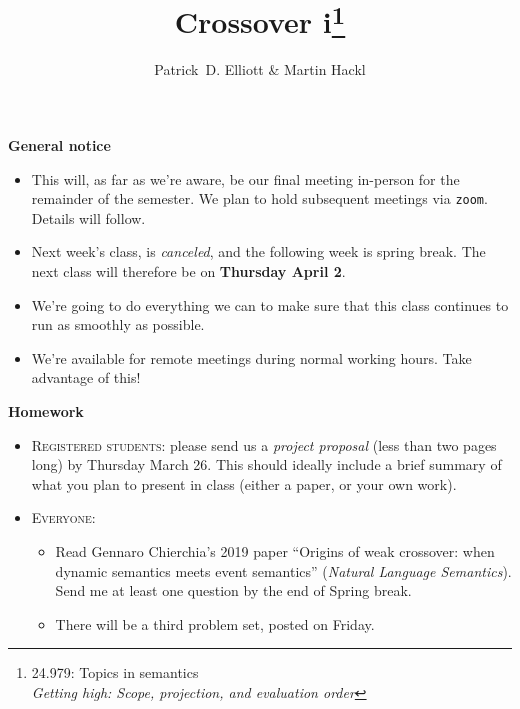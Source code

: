 \documentclass[nols,twoside,nofonts,nobib,nohyper]{tufte-handout}
\title{Crossover i\thanks{24.979: Topics in
    semantics\\\noindent\textit{Getting high: Scope, projection, and evaluation order}}}
\author[Patrick D. Elliott and Martin Hackl]{Patrick~D. Elliott\sidenote{\texttt{pdell@mit.edu}} \& Martin Hackl\sidenote{\texttt{hackl@mit.edu}}}
\begin{document}
\maketitle%

\begin{tcolorbox}
  \textbf{General notice}
  \tcblower
  \begin{itemize}
      \item This will, as far as we're aware, be our final meeting in-person for
      the remainder of the semester. We plan to hold subsequent meetings via
      \texttt{zoom}. Details will follow.

      \item Next week's class, is \textit{canceled}, and the following week is
      spring break. The next class will therefore be on \textbf{Thursday April 2}.

      \item We're going to do everything we can to make sure that this class
      continues to run as smoothly as possible.

      \item We're
      available for remote meetings during normal working hours. Take advantage of this!
  \end{itemize}
\end{tcolorbox}

\begin{tcolorbox}
  \textbf{Homework}
  \tcblower
  \begin{itemize}
      \item \textsc{Registered students}: please send us a \textit{project proposal}
      (less than two pages long) by Thursday March 26. This should ideally
      include a brief summary of what you plan to present in class (either a
      paper, or your own work).
      \item \textsc{Everyone}:

      \begin{itemize}

          \item Read Gennaro Chierchia's 2019 paper \enquote{Origins of weak
          crossover: when dynamic semantics meets event semantics}
          (\textit{Natural Language Semantics}). Send me at least one question
          by the end of Spring break.

          \item There will be a third problem set, posted on Friday.

      \end{itemize}
  \end{itemize}
\end{tcolorbox}
\end{document}
